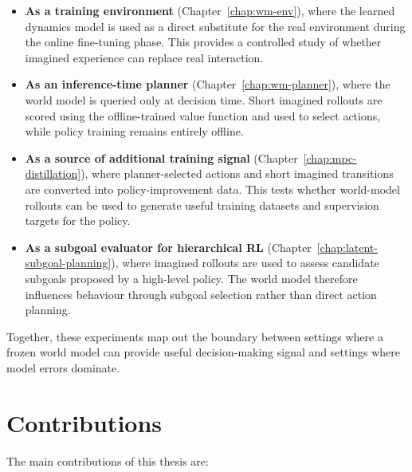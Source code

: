 \begin{itemize}
\item \textbf{As a training environment}
(Chapter~\ref{chap:wm-env}), where the learned dynamics model is used as a direct substitute for the real environment during the online fine-tuning phase. This provides a controlled study of whether imagined experience can replace real interaction.

\item \textbf{As an inference-time planner}
(Chapter~\ref{chap:wm-planner}), where the world model is queried only at decision time. Short imagined rollouts are scored using the offline-trained value function and used to select actions, while policy training remains entirely offline.

\item \textbf{As a source of additional training signal}
(Chapter~\ref{chap:mpc-distillation}), where planner-selected actions and short imagined transitions are converted into policy-improvement data. This tests whether world-model rollouts can be used to generate useful training datasets and supervision targets for the policy.

\item \textbf{As a subgoal evaluator for hierarchical RL}
(Chapter~\ref{chap:latent-subgoal-planning}), where imagined rollouts are used to assess candidate subgoals proposed by a high-level policy. The world model therefore influences behaviour through subgoal selection rather than direct action planning.

\end{itemize}

Together, these experiments map out the boundary between settings where a frozen world model can provide useful decision-making signal and settings where model errors dominate.

\section{Contributions}

The main contributions of this thesis are:

